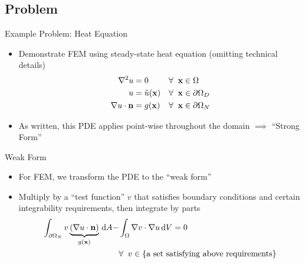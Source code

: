 \subsection{Problem}
\begin{frame}{Example Problem: Heat Equation}
  \begin{itemize}
  \item
    Demonstrate FEM using steady-state heat equation (omitting technical details)
    \begin{align*}
      \nabla^2 u &= 0 &\forall \;\;\mathbf{x}&\in \Omega \\
      u &= \hat{u}(\mathbf{x}) &\forall \;\;\mathbf{x} &\in \partial \Omega_D \\
      \nabla u \cdot \mathbf{n} &= g(\mathbf{x}) &\forall \;\; \mathbf{x} &\in \partial \Omega_N
    \end{align*}
  \item
    As written, this PDE applies point-wise throughout the domain $\implies$ ``Strong Form''
  \end{itemize}
\end{frame}


\begin{frame}{Weak Form}

  \begin{itemize}
  \item
    For FEM, we transform the PDE to the ``weak form''
  \item
    Multiply by a ``test function'' $v$ that satisfies boundary conditions and 
    certain integrability requirements, then integrate by parts
    \begin{align*}
      \int_{\partial \Omega_N} v \underbrace{(\nabla u \cdot \mathbf{n})}_{g(\mathbf{x})}\,\mathrm{d}A - 
      &\int_{\Omega} \nabla v \cdot \nabla u \,\mathrm{d}V = 0  \\
      &\forall\;\; v \in 
      \{\text{a set satisfying above requirements}\}
    \end{align*}
  \end{itemize}

\end{frame}


